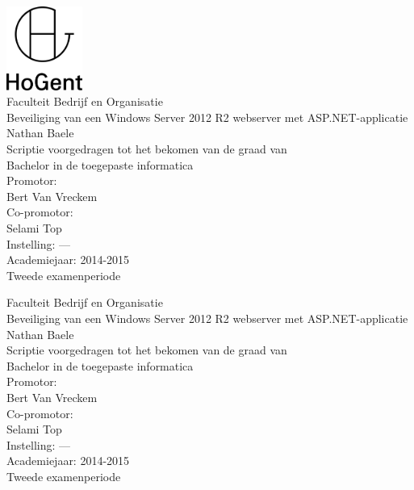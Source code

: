 \documentclass[pdftex,a4paper,12pt]{report}
\newcommand{\emptypage}{
\newpage
\thispagestyle{empty}
\mbox{}
\newpage
}
\newcommand{\student}{Nathan Baele}
\newcommand{\promotor}{Bert Van Vreckem}
\newcommand{\copromotor}{Selami Top}
\newcommand{\instelling}{---}
\newcommand{\titel}{Beveiliging van een Windows Server 2012 R2 webserver met ASP.NET-applicatie}
\newcommand{\faculteit}{Faculteit Bedrijf en Organisatie}
\newcommand{\rapporttype}{Scriptie voorgedragen tot het bekomen van de graad van\\Bachelor in de toegepaste informatica}
\newcommand{\academiejaar}{2014-2015}
\newcommand{\examenperiode}{Tweede examenperiode}
\begin{document}
 \sloppy


\begin{titlepage}
  \begin{center}

    \begingroup
    \rmfamily
    \includegraphics[width=2.5cm]{img/HG-beeldmerk-woordmerk}\\[.5cm]
    \faculteit\\[3cm]
    \titel
    \vfill
    \student\\[3.5cm]
    \rapporttype\\[2cm]
    Promotor:\\
    \promotor\\
    Co-promotor:\\
    \copromotor\\[2.5cm]
    Instelling: \instelling\\[.5cm]
    Academiejaar: \academiejaar\\[.5cm]
    \examenperiode
    \endgroup

  \end{center}
  \restoregeometry
\end{titlepage}


\emptypage


\begin{titlepage}
  \begin{center}

    \begingroup
    \rmfamily
    \faculteit\\[3cm]
    \titel
    \vfill
    \student\\[3.5cm]
    \rapporttype\\[2cm]
    Promotor:\\
    \promotor\\
    Co-promotor:\\
    \copromotor\\[2.5cm]
    Instelling: \instelling\\[.5cm]
    Academiejaar: \academiejaar\\[.5cm]
    \examenperiode
    \endgroup

  \end{center}
  \restoregeometry
\end{titlepage}
\end{document}
